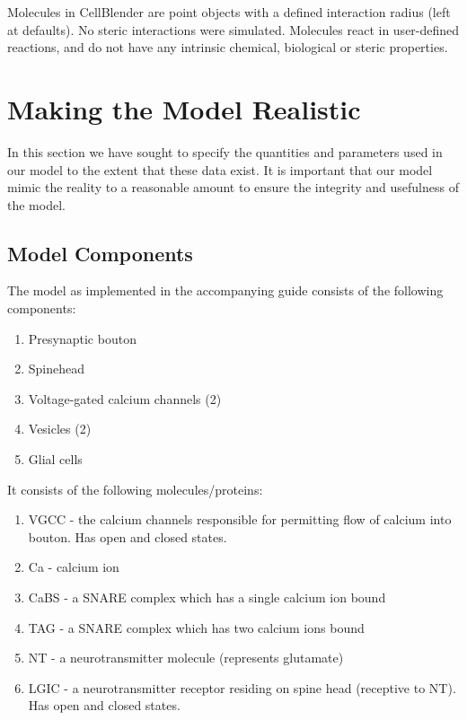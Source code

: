 \documentclass[a4paper]{article}
\begin{document}
Molecules in CellBlender are point objects with a defined interaction radius (left at defaults). No steric interactions were simulated. Molecules react in user-defined reactions, and do not have any intrinsic chemical, biological or steric properties. 

\section{Making the Model Realistic}
In this section we have sought to specify the quantities and parameters used in our model to the extent that these data exist. It is important that our model mimic the reality to a reasonable amount to ensure the integrity and usefulness of the model.

\subsection{Model Components}
The model as implemented in the accompanying guide consists of the following components:
\begin{enumerate} 
    \item Presynaptic bouton
    \item Spinehead
    \item Voltage-gated calcium channels (2)
    \item Vesicles (2)
    \item Glial cells
\end{enumerate}

It consists of the following molecules/proteins:
\begin{enumerate}
    \item VGCC - the calcium channels responsible for permitting flow of calcium into bouton. Has open and closed states.
    \item Ca - calcium ion
    \item CaBS - a SNARE complex which has a single calcium ion bound
    \item TAG - a SNARE complex which has two calcium ions bound
    \item NT - a neurotransmitter molecule (represents glutamate)
    \item LGIC - a neurotransmitter receptor residing on spine head (receptive to NT). Has open and closed states.
\end{enumerate}
\end{document}
